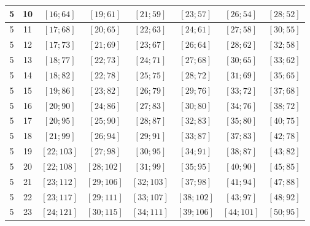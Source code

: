 \documentclass[a4paper,12pt]{article}
\begin{document}
\begin{center}
{\begin{longtable}[H]{|c|c|c|c|c|c|c|c|}
5 &  10 &  $\left[ 16; 64\right]$ &  $\left[ 19; 61\right]$ &  $\left[ 21; 59\right]$ &  $\left[ 23; 57\right]$ &  $\left[ 26; 54\right]$ &  $\left[ 28; 52\right]$ \tabularnewline \hline
5 &  11 &  $\left[ 17; 68\right]$ &  $\left[ 20; 65\right]$ &  $\left[ 22; 63\right]$ &  $\left[ 24; 61\right]$ &  $\left[ 27; 58\right]$ &  $\left[ 30; 55\right]$ \tabularnewline \hline
5 &  12 &  $\left[ 17; 73\right]$ &  $\left[ 21; 69\right]$ &  $\left[ 23; 67\right]$ &  $\left[ 26; 64\right]$ &  $\left[ 28; 62\right]$ &  $\left[ 32; 58\right]$ \tabularnewline \hline
5 &  13 &  $\left[ 18; 77\right]$ &  $\left[ 22; 73\right]$ &  $\left[ 24; 71\right]$ &  $\left[ 27; 68\right]$ &  $\left[ 30; 65\right]$ &  $\left[ 33; 62\right]$ \tabularnewline \hline
5 &  14 &  $\left[ 18; 82\right]$ &  $\left[ 22; 78\right]$ &  $\left[ 25; 75\right]$ &  $\left[ 28; 72\right]$ &  $\left[ 31; 69\right]$ &  $\left[ 35; 65\right]$ \tabularnewline \hline
5 &  15 &  $\left[ 19; 86\right]$ &  $\left[ 23; 82\right]$ &  $\left[ 26; 79\right]$ &  $\left[ 29; 76\right]$ &  $\left[ 33; 72\right]$ &  $\left[ 37; 68\right]$ \tabularnewline \hline
5 &  16 &  $\left[ 20; 90\right]$ &  $\left[ 24; 86\right]$ &  $\left[ 27; 83\right]$ &  $\left[ 30; 80\right]$ &  $\left[ 34; 76\right]$ &  $\left[ 38; 72\right]$ \tabularnewline \hline
5 &  17 &  $\left[ 20; 95\right]$ &  $\left[ 25; 90\right]$ &  $\left[ 28; 87\right]$ &  $\left[ 32; 83\right]$ &  $\left[ 35; 80\right]$ &  $\left[ 40; 75\right]$ \tabularnewline \hline
5 &  18 &  $\left[ 21; 99\right]$ &  $\left[ 26; 94\right]$ &  $\left[ 29; 91\right]$ &  $\left[ 33; 87\right]$ &  $\left[ 37; 83\right]$ &  $\left[ 42; 78\right]$ \tabularnewline \hline
5 &  19 &  $\left[ 22; 103\right]$ &  $\left[ 27; 98\right]$ &  $\left[ 30; 95\right]$ &  $\left[ 34; 91\right]$ &  $\left[ 38; 87\right]$ &  $\left[ 43; 82\right]$ \tabularnewline \hline
5 &  20 &  $\left[ 22; 108\right]$ &  $\left[ 28; 102\right]$ &  $\left[ 31; 99\right]$ &  $\left[ 35; 95\right]$ &  $\left[ 40; 90\right]$ &  $\left[ 45; 85\right]$ \tabularnewline \hline
5 &  21 &  $\left[ 23; 112\right]$ &  $\left[ 29; 106\right]$ &  $\left[ 32; 103\right]$ &  $\left[ 37; 98\right]$ &  $\left[ 41; 94\right]$ &  $\left[ 47; 88\right]$ \tabularnewline \hline
5 &  22 &  $\left[ 23; 117\right]$ &  $\left[ 29; 111\right]$ &  $\left[ 33; 107\right]$ &  $\left[ 38; 102\right]$ &  $\left[ 43; 97\right]$ &  $\left[ 48; 92\right]$ \tabularnewline \hline
5 &  23 &  $\left[ 24; 121\right]$ &  $\left[ 30; 115\right]$ &  $\left[ 34; 111\right]$ &  $\left[ 39; 106\right]$ &  $\left[ 44; 101\right]$ &  $\left[ 50; 95\right]$ \tabularnewline \hline

\end{longtable}}
\end{center}
\end{document}
